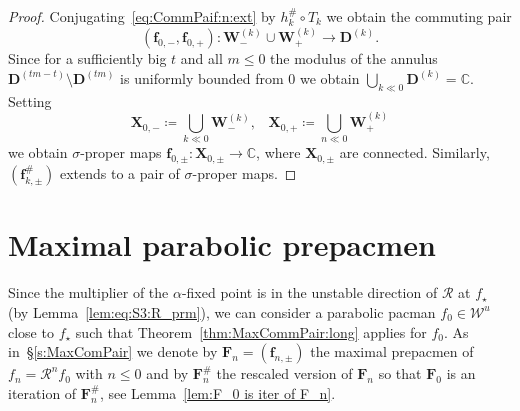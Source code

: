 \documentclass[]{amsart}
\newcommand\RR{\mathcal{R}}
\newcommand{\bF}{{\mathbf F}}
\newcommand{\bX}{{\mathbf X}}
\newcommand{\bW}{{\mathbf W}}
\newcommand{\bD}{{\mathbf D}}
\newcommand{\bbf}{{\mathbf f}}
\newcommand{\str}{{\star}}
\newcommand\WW{\mathcal{W}}
\newcommand{\C}{\mathbb{C}}
\theoremstyle{remark}
\numberwithin{equation}{section}
\theoremstyle{definition}
\begin{document}
\begin{proof}
Conjugating~\eqref{eq:CommPaif:n:ext} by $h_k^\#\circ T_k$ we obtain the commuting pair  
\[(\bbf_{0,-},\bbf_{0,+}) \colon  \bW^{(k)}_{-} \cup   \bW^{(k)}_{+} \to \bD^{(k)}.\]
 Since for a sufficiently big $t$ and all $m\le 0$ the modulus of the annulus $\bD^{(tm-t)} \setminus \bD^{(tm)}$ is uniformly bounded from $0$ we obtain $\displaystyle\bigcup_{k\ll 0} \bD^{(k)} =\C$. Setting
\begin{equation}
\label{eq:Xtm}
\bX_{0,-}\coloneqq \bigcup_{k\ll 0}  \bW^{(k)}_{-},  \;\;\; \bX_{0,+}\coloneqq \bigcup_{n\ll 0} \bW^{(k)}_{+}
\end{equation}
we obtain $\sigma$-proper maps $\bbf_{0,\pm}\colon \bX_{0,\pm}\to \C $, where $\bX_{0,\pm}$ are connected. Similarly, $(\bbf_{k,\pm}^{\#})$ extends to a pair of $\sigma$-proper maps.
\end{proof}








\section{Maximal parabolic prepacmen}
\label{s:MaxParPrep}
Since the multiplier of the $\alpha$-fixed point is in the unstable direction of $\RR$ at $f_\str$ (by Lemma~\ref{lem:eq:S3:R_prm}), we can 
 consider a parabolic pacman $f_0\in \WW^u$ close to $f_\str$ such that  Theorem~\ref{thm:MaxCommPair:long} applies for $f_0$. As in~\S\ref{s:MaxComPair}  we denote by $\bF_n=(\bbf_{n,\pm})$ the maximal prepacmen of $f_n=\RR^{n}f_0$ with $n\le 0$ and by $\bF_n^{\#}$ the rescaled version of $\bF_n$ so that $\bF_{0}$ is an iteration of $\bF^{\#}_n$, see Lemma~\ref{lem:F_0 is iter of F_n}.
\end{document}
